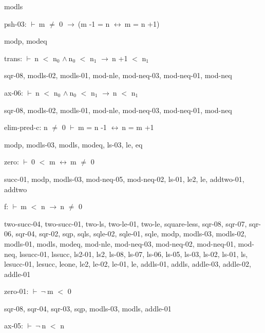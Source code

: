 \documentclass[a4paper]{article}
\newcommand{\Fol}{\mbox{$\vdash\ $}}
\newcommand{\Not}{\mbox{$\neg\ $}}
\newcommand{\And}{\mbox{$\wedge\ $}}
\newcommand{\Imp}{\mbox{$\rightarrow\ $}}
\newcommand{\Equiv}{\mbox{$\leftrightarrow\ $}}
\begin{document}
modls

\bigskip

psh-03: 
 \Fol m $\neq$ 0 \Imp (m -1 = n \Equiv m = n +1)



modp, modeq

\bigskip

trans: 
 \Fol n $<$ $\mbox{n}_{0}$ \And $\mbox{n}_{0}$ $<$ $\mbox{n}_{1}$ \Imp n +1 $<$ $\mbox{n}_{1}$



sqr-08, modls-02, modls-01, mod-nle, mod-neq-03, mod-neq-01, mod-neq

\bigskip

ax-06: 
 \Fol n $<$ $\mbox{n}_{0}$ \And $\mbox{n}_{0}$ $<$ $\mbox{n}_{1}$ \Imp n $<$ $\mbox{n}_{1}$



sqr-08, modls-02, modls-01, mod-nle, mod-neq-03, mod-neq-01, mod-neq

\bigskip

elim-pred-c: 
n $\neq$ 0
 \Fol m = n -1 \Equiv n = m +1



modp, modls-03, modls, modeq, ls-03, le, eq

\bigskip

zero: 
 \Fol 0 $<$ m \Equiv m $\neq$ 0



succ-01, modp, modls-03, mod-neq-05, mod-neq-02, ls-01, le2, le, addtwo-01, addtwo

\bigskip

f: 
 \Fol m $<$ n \Imp n $\neq$ 0



two-succ-04, two-succ-01, two-ls, two-le-01, two-le, square-less, sqr-08, sqr-07, sqr-06, sqr-04, sqr-02, sqp, sqls, sqle-02, sqle-01, sqle, modp, modls-03, modls-02, modls-01, modls, modeq, mod-nle, mod-neq-03, mod-neq-02, mod-neq-01, mod-neq, lssucc-01, lssucc, ls2-01, ls2, ls-08, ls-07, ls-06, ls-05, ls-03, ls-02, ls-01, ls, lesucc-01, lesucc, leone, le2, le-02, le-01, le, addls-01, addls, addle-03, addle-02, addle-01

\bigskip

zero-01: 
 \Fol \Not m $<$ 0



sqr-08, sqr-04, sqr-03, sqp, modls-03, modls, addle-01

\bigskip

ax-05: 
 \Fol \Not n $<$ n
\end{document}
